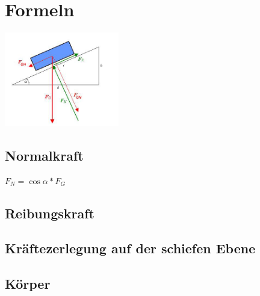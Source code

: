 \documentclass[11pt,twoside,a4paper]{article}
\title{\titleText}
\author{\authorText}
\date{\dateText}
\begin{document}
	\maketitle
	\tableofcontents
	
	\section{Formeln}
	\begin{multicols}{3}
		
		\includegraphics[width=5cm]{se1}
		
		\subsection{Normalkraft}
		\(F_N = \cos\alpha*F_G\)
		\subsection{Reibungskraft}
		\subsection{Kräftezerlegung auf der schiefen Ebene}
		\subsection{Körper}
	\end{multicols}
	
\end{document}
